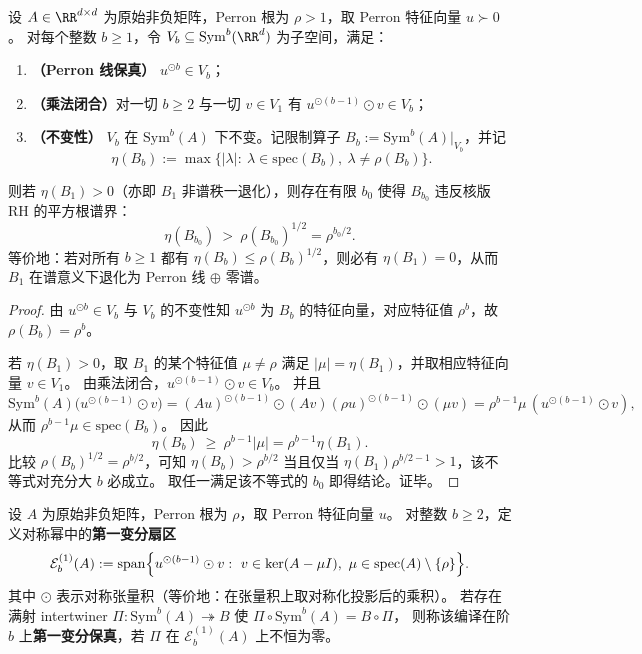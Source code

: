\begin{theorem}\label{thm:pom-functorial-kernel-rh-impossibility}
设 \(A\in\RR^{d\times d}\) 为原始非负矩阵，Perron 根为 \(\rho>1\)，取 Perron 特征向量 \(u\succ0\)。
对每个整数 \(b\ge 1\)，令 \(V_b\subseteq \mathrm{Sym}^b(\RR^d)\) 为子空间，满足：
\begin{enumerate}
  \item \textbf{（Perron 线保真）} \(u^{\odot b}\in V_b\)；
  \item \textbf{（乘法闭合）}对一切 \(b\ge 2\) 与一切 \(v\in V_1\) 有 \(u^{\odot(b-1)}\odot v\in V_b\)；
  \item \textbf{（不变性）} \(V_b\) 在 \(\mathrm{Sym}^b(A)\) 下不变。记限制算子 \(B_b:=\mathrm{Sym}^b(A)|_{V_b}\)，并记
  \[
  \eta(B_b):=\max\bigl\{|\lambda|:\ \lambda\in\mathrm{spec}(B_b),\ \lambda\ne \rho(B_b)\bigr\}.
  \]
\end{enumerate}
则若 \(\eta(B_1)>0\)（亦即 \(B_1\) 非谱秩一退化），则存在有限 \(b_0\) 使得 \(B_{b_0}\) 违反核版 RH 的平方根谱界：
\[
\eta(B_{b_0})\ >\ \rho(B_{b_0})^{1/2}=\rho^{b_0/2}.
\]
等价地：若对所有 \(b\ge 1\) 都有 \(\eta(B_b)\le \rho(B_b)^{1/2}\)，则必有 \(\eta(B_1)=0\)，从而 \(B_1\) 在谱意义下退化为 Perron 线 \(\oplus\) 零谱。
\end{theorem}
\begin{proof}
由 \(u^{\odot b}\in V_b\) 与 \(V_b\) 的不变性知 \(u^{\odot b}\) 为 \(B_b\) 的特征向量，对应特征值 \(\rho^b\)，故 \(\rho(B_b)=\rho^b\)。
\par
若 \(\eta(B_1)>0\)，取 \(B_1\) 的某个特征值 \(\mu\ne\rho\) 满足 \(|\mu|=\eta(B_1)\)，并取相应特征向量 \(v\in V_1\)。
由乘法闭合，\(u^{\odot(b-1)}\odot v\in V_b\)。
并且
\[
\mathrm{Sym}^b(A)\bigl(u^{\odot(b-1)}\odot v\bigr)
=(Au)^{\odot(b-1)}\odot(Av)
(\rho u)^{\odot(b-1)}\odot(\mu v)
=\rho^{b-1}\mu\,(u^{\odot(b-1)}\odot v),
\]
从而 \(\rho^{b-1}\mu\in\mathrm{spec}(B_b)\)。
因此
\[
\eta(B_b)\ \ge\ \rho^{b-1}|\mu|=\rho^{b-1}\eta(B_1).
\]
比较 \(\rho(B_b)^{1/2}=\rho^{b/2}\)，可知
\(
\eta(B_b)>\rho^{b/2}
\)
当且仅当 \(\eta(B_1)\rho^{b/2-1}>1\)，该不等式对充分大 \(b\) 必成立。
取任一满足该不等式的 \(b_0\) 即得结论。证毕。
\end{proof}

\begin{definition}[第一变分扇区与保真编译]\label{def:pom-first-variation-sector}
设 \(A\) 为原始非负矩阵，Perron 根为 \(\rho\)，取 Perron 特征向量 \(u\)。
对整数 \(b\ge 2\)，定义对称幂中的\textbf{第一变分扇区}
\[
\mathcal{E}^{(1)}_{b}(A):=
\mathrm{span}\Bigl\{u^{\odot(b-1)}\odot v:\ v\in \ker(A-\mu I),\ \mu\in\mathrm{spec}(A)\setminus\{\rho\}\Bigr\}.
\]
其中 \(\odot\) 表示对称张量积（等价地：在张量积上取对称化投影后的乘积）。
若存在满射 intertwiner \(\Pi:\mathrm{Sym}^b(A)\twoheadrightarrow B\) 使 \(\Pi\circ \mathrm{Sym}^b(A)=B\circ\Pi\)，
则称该编译在阶 \(b\) 上\textbf{第一变分保真}，若 \(\Pi\) 在 \(\mathcal{E}^{(1)}_{b}(A)\) 上不恒为零。
\end{definition}

